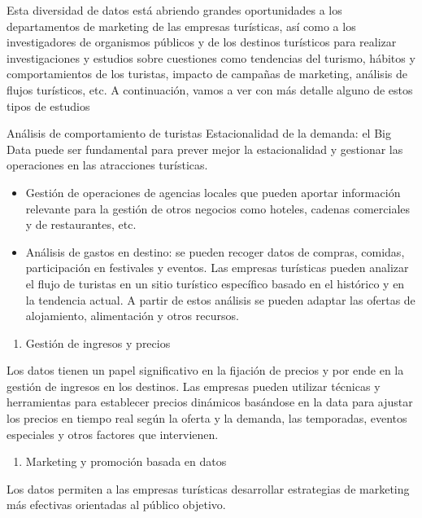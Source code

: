\documentclass[
  letterpaper,
  DIV=11,
  numbers=noendperiod]{scrreprt}
\providecommand{\tightlist}{%
  \setlength{\itemsep}{0pt}\setlength{\parskip}{0pt}}\usepackage{longtable,booktabs,array}
\begin{document}
Esta diversidad de datos está abriendo grandes oportunidades a los
departamentos de marketing de las empresas turísticas, así como a los
investigadores de organismos públicos y de los destinos turísticos para
realizar investigaciones y estudios sobre cuestiones como tendencias del
turismo, hábitos y comportamientos de los turistas, impacto de campañas
de marketing, análisis de flujos turísticos, etc. A continuación, vamos
a ver con más detalle alguno de estos tipos de estudios

Análisis de comportamiento de turistas Estacionalidad de la demanda: el
Big Data puede ser fundamental para prever mejor la estacionalidad y
gestionar las operaciones en las atracciones turísticas.

\begin{itemize}
\tightlist
\item
  Gestión de operaciones de agencias locales que pueden aportar
  información relevante para la gestión de otros negocios como hoteles,
  cadenas comerciales y de restaurantes, etc.
\item
  Análisis de gastos en destino: se pueden recoger datos de compras,
  comidas, participación en festivales y eventos. Las empresas
  turísticas pueden analizar el flujo de turistas en un sitio turístico
  específico basado en el histórico y en la tendencia actual. A partir
  de estos análisis se pueden adaptar las ofertas de alojamiento,
  alimentación y otros recursos.
\end{itemize}

\begin{enumerate}
\def\labelenumi{\arabic{enumi}.}
\setcounter{enumi}{3}
\tightlist
\item
  Gestión de ingresos y precios
\end{enumerate}

Los datos tienen un papel significativo en la fijación de precios y por
ende en la gestión de ingresos en los destinos. Las empresas pueden
utilizar técnicas y herramientas para establecer precios dinámicos
basándose en la data para ajustar los precios en tiempo real según la
oferta y la demanda, las temporadas, eventos especiales y otros factores
que intervienen.

\begin{enumerate}
\def\labelenumi{\arabic{enumi}.}
\setcounter{enumi}{4}
\tightlist
\item
  Marketing y promoción basada en datos
\end{enumerate}

Los datos permiten a las empresas turísticas desarrollar estrategias de
marketing más efectivas orientadas al público objetivo.
\end{document}
